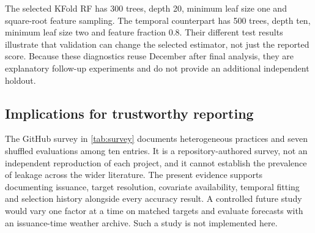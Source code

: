 The selected KFold RF has 300 trees, depth 20, minimum leaf size one and square-root feature sampling. The temporal counterpart has 500 trees, depth ten, minimum leaf size two and feature fraction 0.8. Their different test results illustrate that validation can change the selected estimator, not just the reported score. Because these diagnostics reuse December after final analysis, they are explanatory follow-up experiments and do not provide an additional independent holdout.

\subsection{Implications for trustworthy reporting}
The GitHub survey in \cref{tab:survey} documents heterogeneous practices and seven shuffled evaluations among ten entries. It is a repository-authored survey, not an independent reproduction of each project, and it cannot establish the prevalence of leakage across the wider literature. The present evidence supports documenting issuance, target resolution, covariate availability, temporal fitting and selection history alongside every accuracy result. A controlled future study would vary one factor at a time on matched targets and evaluate forecasts with an issuance-time weather archive. Such a study is not implemented here.
